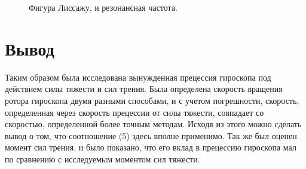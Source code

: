 \documentclass[a4paper, 12pt]{article}%
\begin{document}
\begin{figure}[h!]
\caption{Фигура Лиссажу, и резонансная частота.}
\end{figure}

\section{Вывод}
Таким образом была исследована вынужденная прецессия гироскопа под действием силы тяжести и сил трения. Была определена скорость вращения ротора гироскопа двумя разными способами, и с учетом погрешности, скорость, определенная через скорость прецессии от силы тяжести, совпадает со скоростью, определенной более точным методам. Исходя из этого можно сделать вывод о том, что соотношение (5) здесь вполне применимо. Так же был оценен момент сил трения, и было показано, что его вклад в прецессию гироскопа мал по сравнению с исследуемым моментом сил тяжести.
\end{document}
